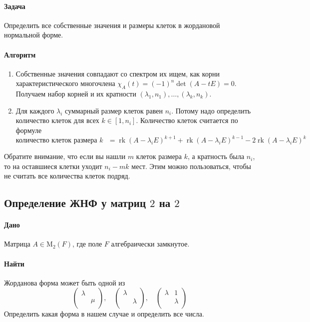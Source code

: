 \documentclass{article}
\newcommand{\Matrix}[2]{\operatorname{\mathrm{M}_{#2}}(#1)}
\newcommand{\rk}{\operatorname{rk}}
\begin{document}
\paragraph{Задача}

Определить все собственные значения и размеры клеток в жордановой нормальной форме.

\paragraph{Алгоритм}

\begin{enumerate}
\item Собственные значения совпадают со спектром их ищем, как корни характеристического многочлена $\chi_A(t) = (-1)^n\det(A - t E) = 0$.
Получаем набор корней и их кратности $(\lambda_1, n_1),\ldots,(\lambda_k,n_k)$.

\item Для каждого $\lambda_i$ суммарный размер клеток равен $n_i$.
Потому надо определить количество клеток для всех $k\in [1, n_i]$.
Количество клеток считается по формуле
\[
\text{количество клеток размера $k$ } = \rk (A - \lambda_i E)^{k+1} + \rk(A - \lambda_i E)^{k-1} - 2 \rk(A - \lambda_i E)^k
\]
\end{enumerate}

Обратите внимание, что если вы нашли $m$ клеток размера $k$, а кратность была $n_i$, то на оставшиеся клетки уходит $n_i - mk$ мест.
Этим можно пользоваться, чтобы не считать все количества клеток подряд.

\subsection{Определение ЖНФ у матриц $2$ на $2$}

\paragraph{Дано}

Матрица $A\in \Matrix{F}{2}$, где поле $F$ алгебраически замкнутое.

\paragraph{Найти}

Жорданова форма может быть одной из
\[
\begin{pmatrix}
{\lambda}&{}\\
{}&{\mu}\\
\end{pmatrix}
,\quad
\begin{pmatrix}
{\lambda}&{}\\
{}&{\lambda}\\
\end{pmatrix}
,\quad
\begin{pmatrix}
{\lambda}&{1}\\
{}&{\lambda}\\
\end{pmatrix}
\]
Определить какая форма в нашем случае и определить все числа.
\end{document}
